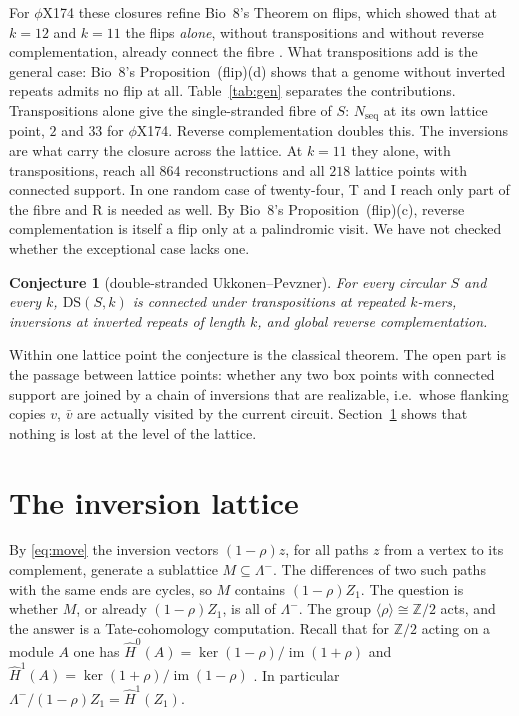 \documentclass[11pt]{article}
\theoremstyle{plain}
\newtheorem{conjecture}[theorem]{Conjecture}
\theoremstyle{definition}
\theoremstyle{remark}
\newcommand{\Z}{\mathbb{Z}}
\newcommand{\DS}{\mathrm{DS}}
\newcommand{\Lm}{\Lambda^{-}}
\newcommand{\Nseq}{N_{\mathrm{seq}}}
\newcommand{\Hh}{\widehat{H}}
\begin{document}
For $\phi$X174 these closures refine Bio~8's Theorem on flips, which showed that at $k=12$ and
$k=11$ the flips \emph{alone}, without transpositions and without reverse complementation, already
connect the fibre \cite[\S7]{Bio8}. What transpositions add is the general case: Bio~8's
Proposition~(flip)(d) shows that a genome without inverted repeats admits no flip at all.
Table~\ref{tab:gen} separates the contributions. Transpositions alone give the single-stranded fibre of
$S$: $\Nseq$ at its own lattice point, $2$ and $33$ for $\phi$X174. Reverse complementation doubles
this. The inversions are what carry the closure across the lattice. At $k=11$ they alone, with
transpositions, reach all $864$ reconstructions and all $218$ lattice points with connected support. In
one random case of twenty-four, T and I reach only part of the fibre and R is needed as well. By Bio~8's
Proposition~(flip)(c), reverse complementation is itself a flip only at a palindromic visit. We have not
checked whether the exceptional case lacks one.

\begin{conjecture}[double-stranded Ukkonen--Pevzner]\label{conj:gen}
For every circular $S$ and every $k$, $\DS(S,k)$ is connected under transpositions at repeated
$k$-mers, inversions at inverted repeats of length $k$, and global reverse complementation.
\end{conjecture}

Within one lattice point the conjecture is the classical theorem. The open part is the passage
between lattice points: whether any two box points with connected support are joined by a chain of
inversions that are realizable, i.e.\ whose flanking copies $v$, $\bar v$ are actually visited by the
current circuit. Section~\ref{sec:lattice} shows that nothing is lost at the level of the lattice.

\section{The inversion lattice}\label{sec:lattice}

By \eqref{eq:move} the inversion vectors $(1-\rho)z$, for all paths $z$ from a vertex to its complement,
generate a sublattice $M\subseteq\Lm$. The differences of two such paths with the same ends are cycles,
so $M$ contains $(1-\rho)Z_1$. The question is whether $M$, or already $(1-\rho)Z_1$, is all of $\Lm$.
The group $\langle\rho\rangle\cong\Z/2$ acts, and the answer is a Tate-cohomology computation. Recall
that for $\Z/2$ acting on a module $A$ one has
$\Hh^0(A)=\ker(1-\rho)/\operatorname{im}(1+\rho)$ and $\Hh^1(A)=\ker(1+\rho)/\operatorname{im}(1-\rho)$
\cite{Bro82}. In particular $\Lm/(1-\rho)Z_1=\Hh^1(Z_1)$.
\end{document}
